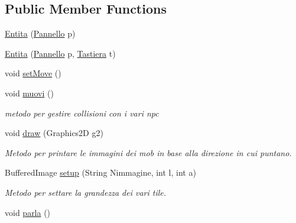 \subsection*{Public Member Functions}
\begin{DoxyCompactItemize}
\item 
\hyperlink{class_entita_1_1_entita_a2080d433e5b9b6ce5c9f0b9ec426e6fb}{Entita} (\hyperlink{classa_1_1survival_1_1game_1_1_pannello}{Pannello} p)
\item 
\hyperlink{class_entita_1_1_entita_a6984a7f67889d66d0b6e3627ff46b289}{Entita} (\hyperlink{classa_1_1survival_1_1game_1_1_pannello}{Pannello} p, \hyperlink{classa_1_1survival_1_1game_1_1_tastiera}{Tastiera} t)
\item 
void \hyperlink{class_entita_1_1_entita_a447f807a76b7ea97a78cb76241fe8bc8}{set\+Move} ()
\item 
void \hyperlink{class_entita_1_1_entita_a1fe2f184b3cc7345c6a0f08d183a1d0b}{muovi} ()
\begin{DoxyCompactList}\small\item\em metodo per gestire collisioni con i vari npc \end{DoxyCompactList}\item 
void \hyperlink{class_entita_1_1_entita_ae8c972c0fb4fcbc09c2219dd32cbd053}{draw} (Graphics2D g2)
\begin{DoxyCompactList}\small\item\em Metodo per printare le immagini dei mob in base alla direzione in cui puntano. \end{DoxyCompactList}\item 
Buffered\+Image \hyperlink{class_entita_1_1_entita_a2f9ef9abd43cd7e34cd446aef3f499ab}{setup} (String Nimmagine, int l, int a)
\begin{DoxyCompactList}\small\item\em Metodo per settare la grandezza dei vari tile. \end{DoxyCompactList}\item 
void \hyperlink{class_entita_1_1_entita_a8310c90e226ac9bc11547a3adb9cd0f3}{parla} ()
\end{DoxyCompactItemize}
